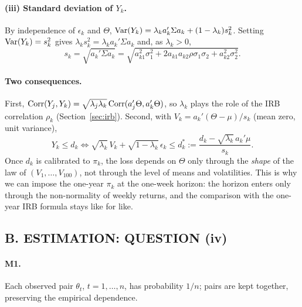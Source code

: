 \paragraph{(iii) Standard deviation of $Y_k$.}
By independence of $\epsilon_k$ and $\Theta$, $\mathrm{Var}(Y_k)=\lambda_ka_k'\Sigma a_k+(1-\lambda_k)s_k^2$. Setting $\mathrm{Var}(Y_k)=s_k^2$ gives $\lambda_ks_k^2=\lambda_ka_k'\Sigma a_k$ and, as $\lambda_k>0$,
\begin{equation}
\label{eq:sk}
s_k=\sqrt{a_k'\Sigma a_k}=\sqrt{a_{k1}^2\sigma_1^2+2a_{k1}a_{k2}\rho\sigma_1\sigma_2+a_{k2}^2\sigma_2^2}.
\end{equation}

\paragraph{Two consequences.}
First, $\mathrm{Corr}(Y_j,Y_k)=\sqrt{\lambda_j\lambda_k}\,\mathrm{Corr}(a_j'\Theta,a_k'\Theta)$, so $\lambda_k$ plays the role of the IRB correlation $\rho_k$ (Section~\ref{sec:irb}). Second, with $V_k=a_k'(\Theta-\mu)/s_k$ (mean zero, unit variance),
\begin{equation}
\label{eq:standardised}
Y_k\le d_k\iff\sqrt{\lambda_k}\,V_k+\sqrt{1-\lambda_k}\,\epsilon_k\le d_k^*:=\frac{d_k-\sqrt{\lambda_k}\,a_k'\mu}{s_k}.
\end{equation}
Once $d_k$ is calibrated to $\pi_k$, the loss depends on $\Theta$ only through the \emph{shape} of the law of $(V_1,\dots,V_{100})$, not through the level of means and volatilities. This is why we can impose the one-year $\pi_k$ at the one-week horizon: the horizon enters only through the non-normality of weekly returns, and the comparison with the one-year IRB formula stays like for like.

\subsection*{B. ESTIMATION: QUESTION (iv)}
\paragraph{M1.} Each observed pair $\theta_t$, $t=1,\dots,n$, has probability $1/n$; pairs are kept together, preserving the empirical dependence.


